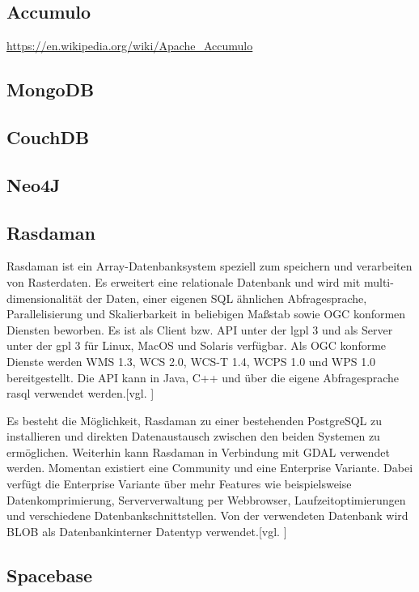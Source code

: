 \subsection{Accumulo}
\label{accumulo}
\url{https://en.wikipedia.org/wiki/Apache_Accumulo}

\subsection{MongoDB}

\subsection{CouchDB}

\subsection{Neo4J}

\newpage

\subsection{Rasdaman}

Rasdaman ist ein Array-Datenbanksystem speziell zum speichern und verarbeiten von Rasterdaten.
Es erweitert eine relationale Datenbank und wird mit  multi-dimensionalität der Daten, einer eigenen SQL ähnlichen Abfragesprache, Parallelisierung und Skalierbarkeit in beliebigen Maßstab sowie OGC konformen Diensten beworben.
Es ist als Client bzw. API unter der \Gls{lgpl} 3 und als Server unter der \Gls{gpl} 3 für Linux, MacOS und Solaris verfügbar.
Als OGC konforme Dienste werden WMS 1.3, WCS 2.0, WCS-T 1.4, WCPS 1.0 und WPS 1.0 bereitgestellt.
Die API kann in Java, C++ und über die eigene Abfragesprache rasql verwendet werden.[vgl. \cite{website:rasdamanogeo}]

Es besteht die Möglichkeit, Rasdaman zu einer bestehenden PostgreSQL zu installieren und direkten Datenaustausch zwischen den beiden Systemen zu ermöglichen.
Weiterhin kann Rasdaman in Verbindung mit GDAL verwendet werden.
Momentan existiert eine Community und eine Enterprise Variante. Dabei verfügt die Enterprise Variante über mehr Features wie beispielsweise Datenkomprimierung, Serververwaltung per Webbrowser, Laufzeitoptimierungen und verschiedene Datenbankschnittstellen.
Von der verwendeten Datenbank wird BLOB als Datenbankinterner Datentyp verwendet.[vgl. \cite{website:rasdamanowiki}]


\subsection{Spacebase}

